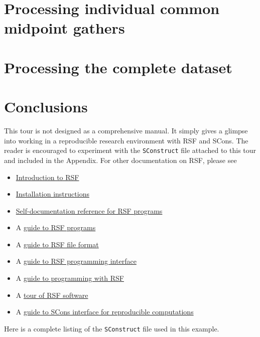 \section{Processing individual common midpoint gathers}

 \clearpage
{} \clearpage
{} \clearpage
{} \clearpage
{} \clearpage

\section{Processing the complete dataset}

 \clearpage
{} \clearpage

\section{Conclusions}

This tour is not designed as a comprehensive manual. It simply gives a
glimpse into working in a reproducible research environment with RSF
and SCons. The reader is encouraged to experiment with the
\texttt{SConstruct} file attached to this tour and included in the
Appendix. For other documentation on RSF, please see
\begin{itemize}
\item \href{http://www.reproducibility.org/RSF/book/rsf/rsf/tour_html/}{Introduction to RSF}  
\item  \href{http://www.reproducibility.org/RSF/book/rsf/rsf/install_html/}{Installation instructions}
\item \href{http://www.reproducibility.org/RSF/}{Self-documentation reference for RSF programs}
\item A \href{http://www.reproducibility.org/RSF/book/rsf/rsf/prog_html/}{guide to RSF programs}
\item A \href{http://www.reproducibility.org/RSF/book/rsf/rsf/format_html/}
  {guide to RSF file format}
\item A \href{http://www.reproducibility.org/RSF/book/rsf/rsf/api_html/}{guide to
    RSF programming interface}
\item A \href{http://www.reproducibility.org/RSF/book/rsf/rsf/demo_html/}{guide to programming with RSF}
\item A \href{http://www.reproducibility.org/RSF/book/rsf/rsf/tour_html/}{tour of RSF software}
\item A
  \href{http://www.reproducibility.org/RSF/book/rsf/scons/paper_html/}{guide
    to SCons interface for reproducible computations}
\end{itemize}





Here is a complete listing of the \texttt{SConstruct} file used in this
example.



